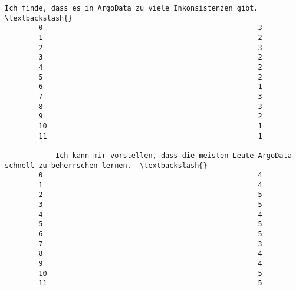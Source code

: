 \documentclass[11pt]{article}
\begin{document}
\begin{Verbatim}[commandchars=\\\{\}]
            Ich finde, dass es in ArgoData zu viele Inkonsistenzen gibt.  \textbackslash{}
        0                                                   3              
        1                                                   2              
        2                                                   3              
        3                                                   2              
        4                                                   2              
        5                                                   2              
        6                                                   1              
        7                                                   3              
        8                                                   3              
        9                                                   2              
        10                                                  1              
        11                                                  1              
        
            Ich kann mir vorstellen, dass die meisten Leute ArgoData schnell zu beherrschen lernen.  \textbackslash{}
        0                                                   4                                         
        1                                                   4                                         
        2                                                   5                                         
        3                                                   5                                         
        4                                                   4                                         
        5                                                   5                                         
        6                                                   5                                         
        7                                                   3                                         
        8                                                   4                                         
        9                                                   4                                         
        10                                                  5                                         
        11                                                  5                                         
        

\end{Verbatim}
\end{document}
